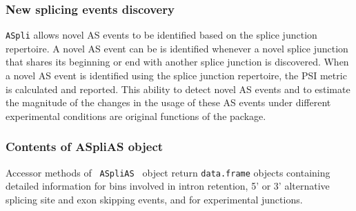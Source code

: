\documentclass{article}
\begin{document}
\subsubsection{New splicing events discovery} 
\texttt{ASpli} allows novel AS events to be identified based on the splice
junction repertoire. A novel AS event can be is identified whenever a
novel splice junction that shares its beginning or end with another splice 
junction is discovered. When a novel AS event is identified using the splice
junction repertoire, the PSI metric is calculated and reported. This ability to
detect novel AS events and to estimate the magnitude of the changes in the usage
of these AS events under different experimental conditions are original
functions of the package.

\subsubsection{Contents of ASpliAS object}
\label{secASpliAsContent}

Accessor methods of \texttt{ ASpliAS } object return \texttt{data.frame}
objects containing detailed information for bins involved in intron retention,
5' or 3' alternative splicing site and exon skipping events, and for
experimental junctions. 
\end{document}
